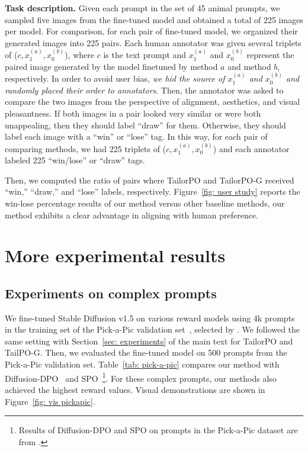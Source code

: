 \textbf{Task description.}
Given each prompt in the set of 45 animal prompts, we sampled five images from the fine-tuned model and obtained a total of 225 images per model.
For comparison, for each pair of fine-tuned model, we organized their generated images into 225 pairs. 
Each human annotator was given several triplets of ($c, x^{(a)}_1, x^{(b)}_0$), where $c$ is the text prompt and $x^{(a)}_1$ and $x^{(b)}_0$ represent the paired image generated by the model finetuned by method $a$ and method $b$, respectively.
In order to avoid user bias, \textit{we hid the source of $x^{(a)}_1$ and $x^{(b)}_0$ and randomly placed their order to annotators}.
Then, the annotator was asked to compare the two images from the perspective of alignment, aesthetics, and visual pleasantness. If both images in a pair looked very similar or were both unappealing, then they should label ``draw'' for them. Otherwise, they should label each image with a ``win'' or ``lose'' tag. In this way, for each pair of comparing methods, we had 225 triplets of ($c, x^{(a)}_1, x^{(b)}_0$) and each annotator labeled 225 ``win/lose'' or ``draw'' tags.


Then, we computed the ratio of pairs where TailorPO and TailorPO-G received ``win,'' ``draw,'' and ``lose'' labels, respectively.
Figure~\ref{fig: user study} reports the win-lose percentage results of our method versus other baseline methods, our method exhibits a clear advantage in aligning with human preference.


\section{More experimental results}

\subsection{Experiments on complex prompts}
\label{subsec: app_pick}

We fine-tuned Stable Diffusion v1.5 on various reward models using 4k prompts in the training set of the Pick-a-Pic validation set~\citep{kirstain2023pick}, selected by \citet{liang2024spo}.
We followed the same setting with Section~\ref{sec: experiments} of the main text for TailorPO and TailPO-G.
Then, we evaluated the fine-tuned model on 500 prompts from the Pick-a-Pic validation set.
Table~\ref{tab: pick-a-pic} compares our method with Diffusion-DPO~\citep{wallace2024diffusiondpo} and SPO~\citep{liang2024spo}\footnote{Results of Diffusion-DPO and SPO on prompts in the Pick-a-Pic dataset are from \citep{liang2024spo}.}.
For these complex prompts, our methods also achieved the highest reward values.
Visual demonstrations are shown in Figure~\ref{fig: vis pickapic}.

